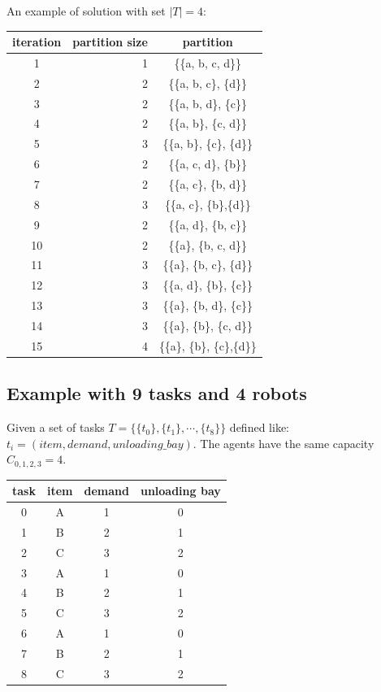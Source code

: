 An example of solution with set $|T| = 4$:
\begin{center}
  \begin{tabular}{|c|r|c|} \hline
  \textbf{iteration} & \textbf{partition size} & \textbf{partition} \\ \hline
  1    & 1    & \{\{a, b, c, d\}\}   \\
  2    & 2    & \{\{a, b, c\}, \{d\}\}   \\
  3    & 2    & \{\{a, b, d\}, \{c\}\}   \\
  4    & 2    & \{\{a, b\}, \{c, d\}\}   \\
  5    & 3    & \{\{a, b\}, \{c\}, \{d\}\}   \\
  6    & 2    & \{\{a, c, d\}, \{b\}\}   \\
  7    & 2    & \{\{a, c\}, \{b, d\}\}   \\
  8    & 3    & \{\{a, c\}, \{b\},\{d\}\}   \\
  9    & 2    & \{\{a, d\}, \{b, c\}\}   \\
  10   & 2    & \{\{a\}, \{b, c, d\}\}   \\
  11   & 3    & \{\{a\}, \{b, c\}, \{d\}\}   \\
  12   & 3    & \{\{a, d\}, \{b\}, \{c\}\}   \\
  13   & 3    & \{\{a\}, \{b, d\}, \{c\}\}   \\
  14   & 3    & \{\{a\}, \{b\}, \{c, d\}\}   \\
  15   & 4    & \{\{a\}, \{b\}, \{c\},\{d\}\}   \\ \hline       
  \end{tabular}
\end{center}

\subsection*{Example with 9 tasks and 4 robots}
Given a set of tasks $T = \{  \{t_0\}, \{t_1\}, \cdots, \{t_8\} \}$ defined like: 
${t_i=(item, demand, unloading\_bay)}$. The agents have the same capacity $C_{0,1,2,3} = 4$.

\begin{center}
  \begin{tabular}{|c|c|c|c|} \hline
  \textbf{task} & \textbf{item} & \textbf{demand} & \textbf{unloading bay} \\ \hline
  0    & A    & 1      & 0             \\
  1    & B    & 2      & 1             \\
  2    & C    & 3      & 2             \\
  3    & A    & 1      & 0             \\
  4    & B    & 2      & 1             \\
  5    & C    & 3      & 2             \\
  6    & A    & 1      & 0             \\
  7    & B    & 2      & 1             \\
  8    & C    & 3      & 2             \\ \hline       
  \end{tabular}
\end{center}


